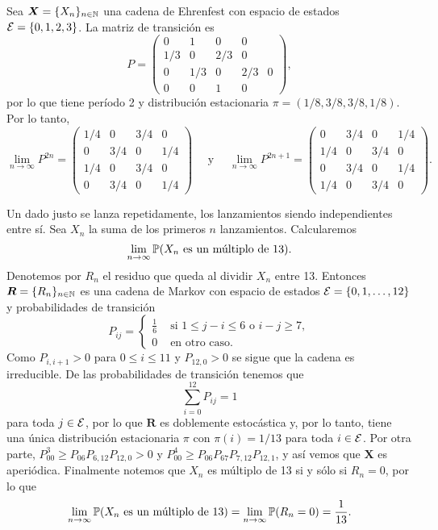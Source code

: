 \begin{example}
    Sea $\bm X = \{X_n\}_{n \in \mathbb{N}}$ una cadena de Ehrenfest con espacio de estados $\mathcal{E} = \{0,1, 2, 3\}$. La matriz de transición es 
    \[
        P = \begin{pmatrix}
            0 & 1 & 0 & 0 \\
            1/3 & 0 & 2/3 & 0 \\
            0 & 1/3 & 0 & 2/3 & 0 \\
            0 & 0 & 1 & 0
        \end{pmatrix},
    \] por lo que tiene período 2 y distribución estacionaria $\pi = (1/8, 3/8, 3/8, 1/8)$. Por lo tanto,
    \[
        \lim_{n \to \infty} P^{2n} = \begin{pmatrix}
            1/4 & 0 & 3/4 & 0 \\
            0 & 3/4 & 0 & 1/4 \\
            1/4 & 0 & 3/4 & 0 \\
            0 & 3/4 & 0 & 1/4
        \end{pmatrix} \quad \text{ y } \quad \lim_{n \to \infty} P^{2n+1}= \begin{pmatrix}
            0 & 3/4 & 0 & 1/4 \\
            1/4 & 0 & 3/4 & 0 \\
            0 & 3/4 & 0 & 1/4 \\
            1/4 & 0 & 3/4 & 0 
        \end{pmatrix}.
    \]
\end{example}

\begin{example}
    Un dado justo se lanza repetidamente, los lanzamientos siendo independientes entre sí. Sea $X_n$ la suma de los primeros $n$ lanzamientos. Calcularemos 
    \[
        \lim_{n \to \infty} \mathbb{P}(X_n \text{ es un múltiplo de } 13).
    \]
    Denotemos por $R_n$ el residuo que queda al dividir $X_n$ entre 13. Entonces $\bm R = \{R_n\}_{n \in \mathbb{N}}$ es una cadena de Markov con espacio de estados $\mathcal{E} = \{0, 1, \ldots, 12\}$ y probabilidades de transición 
    \[
        P_{ij} = \begin{cases}
            \frac 1 6 & \text{ si } 1 \leq j - i \leq 6 \text{ o } i-j \geq 7, \\
            0 & \text{ en otro caso}.
        \end{cases}    
    \] Como $P_{i,i+1} > 0$ para $0 \leq i \leq 11$ y $P_{12,0} > 0$ se sigue que la cadena es irreducible. De las probabilidades de transición tenemos que 
    \[
        \sum_{i = 0}^{12} P_{ij} = 1
    \] para toda $j \in \mathcal{E}$, por lo que $\bm R$ es doblemente estocástica y, por lo tanto, tiene una única distribución estacionaria $\pi$ con $\pi(i) = 1/13$ para toda $i \in \mathcal{E}$. Por otra parte, $P_{00}^3 \geq P_{06}P_{6,12}P_{12,0} > 0$ y $P_{00}^4 \geq P_{06}P_{67}P_{7,12}P_{12,1}$, y así vemos que $\bm X$ es aperiódica. Finalmente notemos que $X_n$ es múltiplo de 13 si y sólo si $R_n = 0$, por lo que 
    \[
        \lim_{n\to \infty}  \mathbb{P}(X_n \text{ es un múltiplo de } 13) = \lim_{n \to \infty} \mathbb{P}(R_n = 0) = \frac{1}{13}.
    \]
\end{example}

